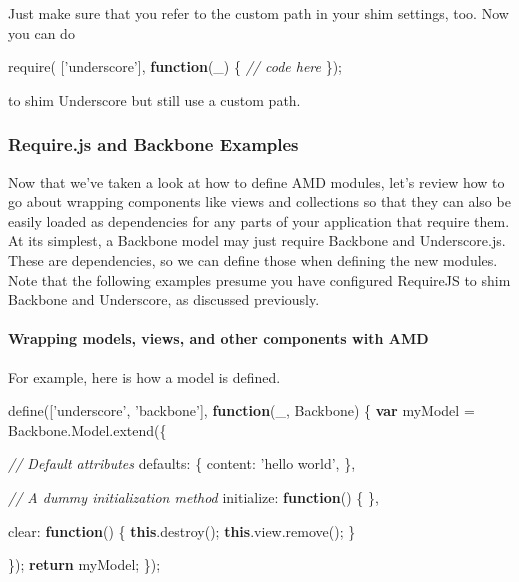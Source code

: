\documentclass[9pt]{book}
\newenvironment{Shaded}{}{}
\newcommand{\KeywordTok}[1]{\textcolor[rgb]{0.00,0.44,0.13}{\textbf{{#1}}}}
\newcommand{\DataTypeTok}[1]{\textcolor[rgb]{0.56,0.13,0.00}{{#1}}}
\newcommand{\StringTok}[1]{\textcolor[rgb]{0.25,0.44,0.63}{{#1}}}
\newcommand{\CommentTok}[1]{\textcolor[rgb]{0.38,0.63,0.69}{\textit{{#1}}}}
\newcommand{\OtherTok}[1]{\textcolor[rgb]{0.00,0.44,0.13}{{#1}}}
\newcommand{\FunctionTok}[1]{\textcolor[rgb]{0.02,0.16,0.49}{{#1}}}
\newcommand{\NormalTok}[1]{{#1}}
\begin{document}
Just make sure that you refer to the custom path in your shim settings,
too. Now you can do

\begin{Shaded}
\begin{Highlighting}[]
\FunctionTok{require}\NormalTok{( [}\StringTok{'underscore'}\NormalTok{], }\KeywordTok{function}\NormalTok{(_) \{}
\CommentTok{// code here}
\NormalTok{\});}
\end{Highlighting}
\end{Shaded}

to shim Underscore but still use a custom path.

\subsubsection{Require.js and Backbone
Examples}\label{require.js-and-backbone-examples}

Now that we've taken a look at how to define AMD modules, let's review
how to go about wrapping components like views and collections so that
they can also be easily loaded as dependencies for any parts of your
application that require them. At its simplest, a Backbone model may
just require Backbone and Underscore.js. These are dependencies, so we
can define those when defining the new modules. Note that the following
examples presume you have configured RequireJS to shim Backbone and
Underscore, as discussed previously.

\paragraph{Wrapping models, views, and other components with
AMD}\label{wrapping-models-views-and-other-components-with-amd}

For example, here is how a model is defined.

\begin{Shaded}
\begin{Highlighting}[]
\FunctionTok{define}\NormalTok{([}\StringTok{'underscore'}\NormalTok{, }\StringTok{'backbone'}\NormalTok{], }\KeywordTok{function}\NormalTok{(_, Backbone) \{}
  \KeywordTok{var} \NormalTok{myModel = }\OtherTok{Backbone}\NormalTok{.}\OtherTok{Model}\NormalTok{.}\FunctionTok{extend}\NormalTok{(\{}

    \CommentTok{// Default attributes}
    \DataTypeTok{defaults}\NormalTok{: \{}
      \DataTypeTok{content}\NormalTok{: }\StringTok{'hello world'}\NormalTok{,}
    \NormalTok{\},}

    \CommentTok{// A dummy initialization method}
    \DataTypeTok{initialize}\NormalTok{: }\KeywordTok{function}\NormalTok{() \{}
    \NormalTok{\},}

    \DataTypeTok{clear}\NormalTok{: }\KeywordTok{function}\NormalTok{() \{}
      \KeywordTok{this}\NormalTok{.}\FunctionTok{destroy}\NormalTok{();}
      \KeywordTok{this}\NormalTok{.}\OtherTok{view}\NormalTok{.}\FunctionTok{remove}\NormalTok{();}
    \NormalTok{\}}

  \NormalTok{\});}
  \KeywordTok{return} \NormalTok{myModel;}
\NormalTok{\});}
\end{Highlighting}
\end{Shaded}
\end{document}
